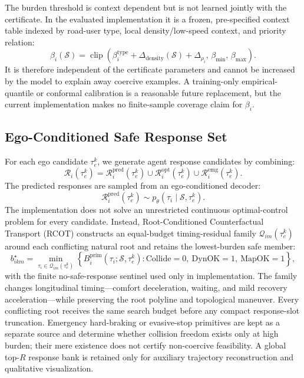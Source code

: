\documentclass[10pt]{article}
\begin{document}
The burden threshold is context dependent but is not learned jointly with the certificate. In the evaluated implementation it is a frozen, pre-specified context table indexed by road-user type, local density/low-speed context, and priority relation:
\begin{equation}
    \beta_i(\mathcal{S})
    =\operatorname{clip}\!\left(\beta^{\mathrm{type}}_i+\Delta_{\mathrm{density}}(\mathcal{S})+\Delta_{\rho_i},\,\beta_{\min},\,\beta_{\max}\right).
\end{equation}
It is therefore independent of the certificate parameters and cannot be increased by the model to explain away coercive examples. A training-only empirical-quantile or conformal calibration is a reasonable future replacement, but the current implementation makes no finite-sample coverage claim for $\beta_i$.

\subsection{Ego-Conditioned Safe Response Set}
\label{app:safe_response}

For each ego candidate $\tau^k_e$, we generate agent response candidates by combining:
\begin{equation}
    \mathcal{R}_i(\tau^k_e)
    =
    \mathcal{R}^{\mathrm{pred}}_i(\tau^k_e)
    \cup
    \mathcal{R}^{\mathrm{opt}}_i(\tau^k_e)
    \cup
    \mathcal{R}^{\mathrm{emg}}_i(\tau^k_e).
\end{equation}
The predicted responses are sampled from an ego-conditioned decoder:
\begin{equation}
    \mathcal{R}^{\mathrm{pred}}_i(\tau^k_e)
    \sim
    p_\theta(\tau_i \mid \mathcal{S},\tau^k_e).
\end{equation}
The implementation does not solve an unrestricted continuous optimal-control problem for every candidate. Instead, Root-Conditioned Counterfactual Transport (RCOT) constructs an equal-budget timing-residual family $\mathcal{Q}_{im}(\tau_e^k)$ around each conflicting natural root and retains the lowest-burden safe member:
\begin{equation}
    b^\star_{ikm}
    =\min_{\tau_i\in\mathcal{Q}_{im}(\tau_e^k)}
    \left\{B_i^{\mathrm{prim}}(\tau_i;\mathcal{S},\tau_e^k):
    \mathrm{Collide}=0,\ \mathrm{DynOK}=1,\ \mathrm{MapOK}=1\right\},
\end{equation}
with the finite no-safe-response sentinel used only in implementation.  The family changes longitudinal timing---comfort deceleration, waiting, and mild recovery acceleration---while preserving the root polyline and topological maneuver.  Every conflicting root receives the same search budget before any compact response-slot truncation.  Emergency hard-braking or evasive-stop primitives are kept as a separate source and determine whether collision freedom exists only at high burden; their mere existence does not certify non-coercive feasibility.  A global top-$R$ response bank is retained only for auxiliary trajectory reconstruction and qualitative visualization.
\end{document}
